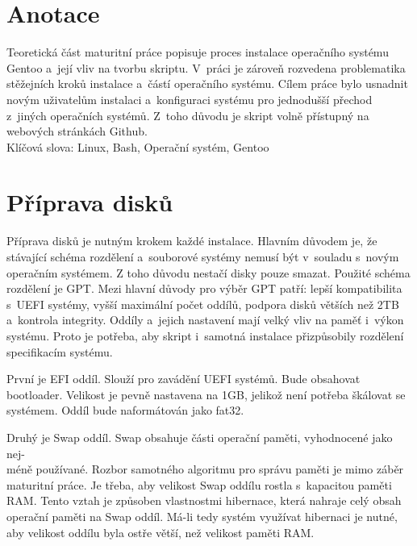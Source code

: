 \documentclass[12pt,a4paper,twoside,]{article}
\begin{document}
\newpage
\renewcommand{\contentsname}{\textsf{Obsah}}\tableofcontents

\newpage
\section{\textsf{Anotace}}
{Teoretická část maturitní práce popisuje proces instalace operačního systému Gentoo
	a~její vliv na tvorbu skriptu. V~práci je zároveň rozvedena problematika stěžejních
	kroků instalace a~částí operačního systému. Cílem práce bylo usnadnit novým uživatelům instalaci a~konfiguraci
	systému pro jednodušší přechod z~jiných operačních systémů. Z~toho důvodu je skript volně přístupný na webových stránkách Github. 
	\vspace{2cm}
	\\Klíčová slova: Linux, Bash, Operační systém, Gentoo
}


\newpage

\section{\textsf{Příprava disků}}
{Příprava disků je nutným krokem každé instalace. Hlavním důvodem je, 
že stávající schéma rozdělení a~souborové systémy nemusí být v~souladu s~novým operačním systémem. 
Z toho důvodu nestačí disky pouze smazat. Použité schéma rozdělení je GPT. 
Mezi hlavní důvody pro výběr GPT patří: lepší kompatibilita s~UEFI systémy, 
vyšší maximální počet oddílů, podpora disků větších než 2TB a~kontrola integrity.
Oddíly a~jejich nastavení mají velký vliv na paměť i~výkon systému. Proto je potřeba, 
aby skript i~samotná instalace přizpůsobily rozdělení specifikacím systému.} 

{První je EFI oddíl. Slouží pro zavádění UEFI systémů. Bude obsahovat bootloader. 
Velikost je pevně nastavena na 1GB, jelikož není potřeba škálovat se systémem.
Oddíl bude naformátován jako fat32.}

{Druhý je Swap oddíl. Swap obsahuje části operační paměti, vyhodnocené jako nej-\\méně používané. 
Rozbor samotného algoritmu pro správu paměti je mimo záběr maturitní práce. Je třeba,
aby velikost Swap oddílu rostla s~kapacitou paměti RAM. Tento vztah je způsoben vlastnostmi hibernace, 
která nahraje celý obsah operační paměti na Swap oddíl. Má-li tedy systém využívat hibernaci je nutné,
aby velikost oddílu byla ostře větší, než velikost paměti RAM. }
\end{document}

